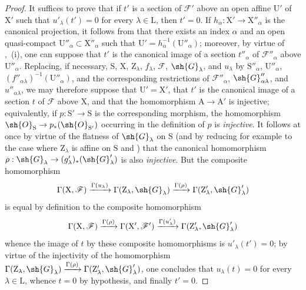 \begin{proof}
It suffices to prove that if $t'$ is a section of $\mathscr{F}'$ above an open affine $\mathrm{U}'$ of $\mathrm{X}'$ such that $u'_\lambda(t')=0$ for every $\lambda\in\mathrm{L}$, then $t'=0$.
If $h_\alpha:\mathrm{X}'\to\mathrm{X}''_\alpha$ is the canonical projection,
it follows from  that there exists an index $\alpha$ and an open quasi-compact $\mathrm{U}''_\alpha\subset\mathrm{X}''_\alpha$ such that $\mathrm{U}'=h_\alpha^{-1}(\mathrm{U}''_\alpha)$; moreover, by virtue of ,~(i), one can suppose that $t'$ is the canonical image of a section $t''_\alpha$ of $\mathscr{F}''_\alpha$ above $\mathrm{U}''_\alpha$.
Replacing, if necessary, $\mathrm{S}$, $\mathrm{X}$, $\mathrm{Z}_\lambda$, $f_\lambda$, $\mathscr{F}$, $\sh{G}_\lambda$, and $u_\lambda$ by $\mathrm{S}''_\alpha$, $\mathrm{U}''_\alpha$, $(f''_{\alpha\lambda})^{-1}(\mathrm{U}''_\alpha)$, and the corresponding restrictions of $\mathscr{F}''_\alpha$, $\sh{G}''_{\alpha\lambda}$, and $u''_{\alpha\lambda}$, we may therefore suppose that $\mathrm{U}'=\mathrm{X}'$, that $t'$ is the canonical image of a section $t$ of $\mathscr{F}$ above $\mathrm{X}$, and that the homomorphism $\mathrm{A}\to\mathrm{A}'$ is injective; equivalently, if $p:\mathrm{S}'\to\mathrm{S}$ is the corresponding morphism, the homomorphism $\sh{O}_\mathrm{S}\to p_*(\sh{O}_{\mathrm{S}'})$ occurring in the definition of $p$ is \emph{injective}.
It follows at once by virtue of the flatness of $\sh{G}_\lambda$ on $\mathrm{S}$ (and by reducing for example to the case where $\mathrm{Z}_\lambda$ is affine on $\mathrm{S}$  and ) that the canonical homomorphism $\rho:\sh{G}_\lambda\to(g'_\lambda)_*(\sh{G}'_\lambda)$ is also \emph{injective}.
But the composite homomorphism
\[
  \Gamma(\mathrm{X},\mathscr{F})\xrightarrow{\Gamma(u_\lambda)}\Gamma(\mathrm{Z}_\lambda,\sh{G}_\lambda)\xrightarrow{\Gamma(\rho)}\Gamma(\mathrm{Z}'_\lambda,\sh{G}'_\lambda)
\]
is equal by definition to the composite homomorphism
\[
  \Gamma(\mathrm{X},\mathscr{F})\xrightarrow{\Gamma(\rho)}\Gamma(\mathrm{X}',\mathscr{F}')\xrightarrow{\Gamma(u'_\lambda)}\Gamma(\mathrm{Z}'_\lambda,\sh{G}'_\lambda)
\]
whence the image of $t$ by these composite homomorphisms is $u'_\lambda(t')=0$; by virtue of the injectivity of the homomorphism $\Gamma(\mathrm{Z}_\lambda,\sh{G}_\lambda)\xrightarrow{\Gamma(\rho)}\Gamma(\mathrm{Z}'_\lambda,\sh{G}'_\lambda)$, one concludes that $u_\lambda(t)=0$ for every $\lambda\in\mathrm{L}$, whence $t=0$ by hypothesis, and finally $t'=0$.
\end{proof}

